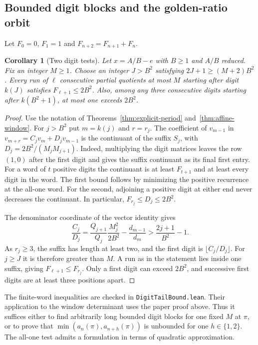 \documentclass[11pt]{amsart}
\newtheorem{corollary}[theorem]{Corollary}
\theoremstyle{definition}
\theoremstyle{remark}
\numberwithin{equation}{section}
\begin{document}
\subsection{Bounded digit blocks and the golden-ratio orbit}
Let $F_0=0$, $F_1=1$ and $F_{n+2}=F_{n+1}+F_n$.
\begin{corollary}[Two digit tests]\label{cor:bounded-digit-block}
Let $x=A/B-e$ with $B\ge1$ and $A/B$ reduced. Fix an integer $M\ge1$.
Choose an integer $J>B^2$ satisfying $2J+1\ge(M+2)B^2$.
Every run of $\ell$ consecutive partial quotients at most $M$ starting
after digit $k(J)$ satisfies $F_{\ell+1}\le2B^2$. Also, among any three
consecutive digits starting after $k(B^2+1)$, at most one exceeds $2B^2$.
\end{corollary}
\begin{proof}
Use the notation of Theorems~\ref{thm:explicit-period}
and~\ref{thm:affine-window}. For $j>B^2$ put $m=k(j)$ and $r=r_j$.
The coefficient of $v_{m-1}$ in $v_{m+r}=C_jv_m+D_jv_{m-1}$ is
the continuant of the suffix $S_j$, with $D_j=2B^2/(M_jM_{j+1})$.
Indeed, multiplying the digit matrices leaves the row $(1,0)$ after
the first digit and gives the suffix continuant as its final first entry.
For a word of $t$ positive digits the continuant is at least $F_{t+1}$
and at least every digit in the word. The first bound follows by
minimizing the positive recurrence at the all-one word. For the second,
adjoining a positive digit at either end never decreases the continuant.
In particular, $F_{r_j}\le D_j\le2B^2$.

The denominator coordinate of the vector identity gives
\[
 \frac{C_j}{D_j}
 =\frac{Q_{j+1}}{Q_j}\frac{M_j^2}{2B^2}-\frac{d_{m-1}}{d_m}
 >\frac{2j+1}{B^2}-1 .
\]
As $r_j\ge3$, the suffix has length at least two, and the first digit
is $\lfloor C_j/D_j\rfloor$. For $j\ge J$ it is therefore greater than $M$.
A run as in the statement lies inside one suffix, giving
$F_{\ell+1}\le F_{r_j}$. Only a first digit can exceed $2B^2$, and
successive first digits are at least three positions apart.
\end{proof}
The finite-word inequalities are checked in \texttt{DigitTail\allowbreak{}Bound.lean}.
Their application to the window determinant uses the paper proof above.
Thus it suffices either to find arbitrarily long bounded digit blocks
for one fixed $M$ at $\pi$, or to prove that
$\min(a_n(\pi),a_{n+h}(\pi))$ is unbounded for one $h\in\{1,2\}$.
The all-one test admits a formulation in terms of quadratic approximation.
\end{document}
